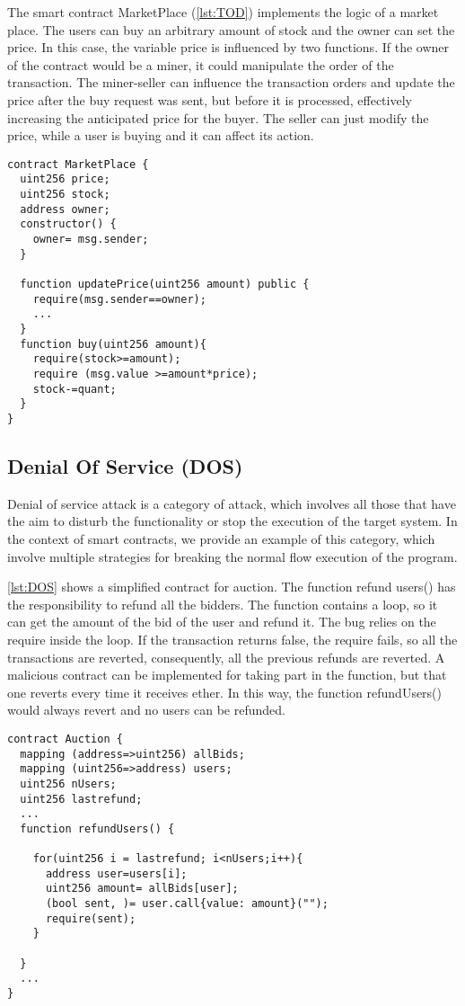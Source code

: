 \documentclass[a4paper,sigconf, language=french,
language=german, language=spanish, language=english]{acmart}
\begin{document}
The smart contract MarketPlace (\autoref{lst:TOD}) implements the logic of a market place. The users can buy an arbitrary amount of stock and the 
owner can set the price. In this case, the variable price is influenced by two functions. If the owner of the contract would be a miner, it could 
manipulate the order of the transaction. The miner-seller can inﬂuence the transaction orders and update the price after the buy request was 
sent, but before it is processed, eﬀectively increasing the anticipated price for the buyer. The seller can just modify the price, while a user is buying and it can affect its action.

\begin{lstlisting}[language=Solidity,caption={Transaction Ordering Dependence},label={lst:TOD}]
contract MarketPlace {
  uint256 price;
  uint256 stock;
  address owner;
  constructor() {
    owner= msg.sender;
  }
  
  function updatePrice(uint256 amount) public {
    require(msg.sender==owner);
    ...
  }
  function buy(uint256 amount){
    require(stock>=amount);
    require (msg.value >=amount*price);
    stock-=quant;
  }
}
\end{lstlisting}

\subsection{Denial Of Service (DOS)} 
Denial of service attack is a category of attack, which involves all those that have the aim to 
disturb the functionality or stop the execution of the target system. In the context of smart contracts, we provide an example of this category, 
which involve multiple strategies for breaking the normal flow execution of the program.

\autoref{lst:DOS} shows a simplified contract for auction. The function refund users() has the responsibility to refund all the bidders. 
The function contains a loop, so it can get the amount of the bid of the user and refund it. The bug relies on the require inside the loop. If the transaction returns false, 
the require fails, so all the transactions are reverted, consequently, all the previous refunds are reverted. A malicious contract can be implemented for taking part in the function, but 
that one reverts every time it receives ether. In this way, the function refundUsers() would always revert and no users can be refunded.

\begin{lstlisting}[language=Solidity,caption={Denial of Service/Out of Gas},label={lst:DOS}]
contract Auction {
  mapping (address=>uint256) allBids;
  mapping (uint256=>address) users;
  uint256 nUsers;
  uint256 lastrefund;
  ... 
  function refundUsers() {
    
    for(uint256 i = lastrefund; i<nUsers;i++){
      address user=users[i];
      uint256 amount= allBids[user];
      (bool sent, )= user.call{value: amount}("");
      require(sent);
    }

  }
  ... 
}
\end{lstlisting}
\end{document}
